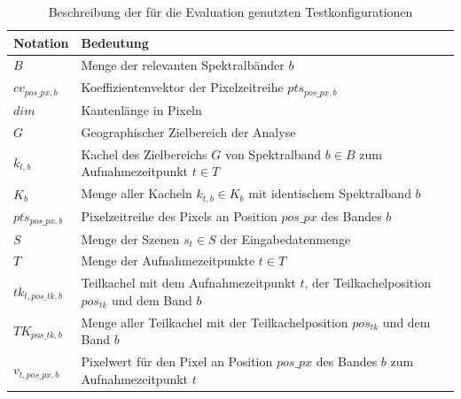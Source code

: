 \begin{table}[h]
          \centering
          \begin{tabular}{| p{2cm} | p{8cm} |}
          	\hline
                  Notation & Bedeutung \\
                  \hline
                  $B$ & Menge der relevanten Spektralbänder $b$ \\
                  \hline
                  $cv_{pos\_px, b}$ & Koeffizientenvektor der Pixelzeitreihe  $pts_{pos\_px, b}$ \\
                  \hline
                  $dim$ & Kantenlänge in Pixeln \\
                  \hline
                  $G$ & Geographischer Zielbereich der Analyse  \\
                  \hline
                  $k_{t, b}$ & Kachel des Zielbereichs $G$ von Spektralband $b \in B$ zum Aufnahmezeitpunkt $t \in T$  \\
                  \hline
                  $K_{b}$ & Menge aller Kacheln $k_{t, b} \in K_b$ mit identischem Spektralband $b$ \\
                  \hline
                  $pts_{pos\_px, b}$ & Pixelzeitreihe des Pixels an Position $pos\_px$ des Bandes $b$ \\
                  \hline
                  $S$ & Menge der Szenen $s_t \in S$ der Eingabedatenmenge \\
                  \hline
		$T$ & Menge der Aufnahmezeitpunkte $t \in T$ \\
                  \hline
                  $tk_{t, pos\_tk, b}$ & Teilkachel mit dem Aufnahmezeitpunkt $t$, der Teilkachelposition $pos_{tk}$ und dem Band $b$ \\
                  \hline
                  $TK_{pos\_tk, b}$ & Menge aller Teilkachel mit der Teilkachelposition $pos_{tk}$ und dem Band $b$ \\
                  \hline
		$v_{t, pos\_px, b}$ & Pixelwert für den Pixel an Position $pos\_px$ des Bandes $b$ zum Aufnahmezeitpunkt $t$ \\
                  \hline

          \end{tabular}
          \caption{Beschreibung der für die Evaluation genutzten Testkonfigurationen}
          \label{tab:descriptionNotation}
\end{table}

